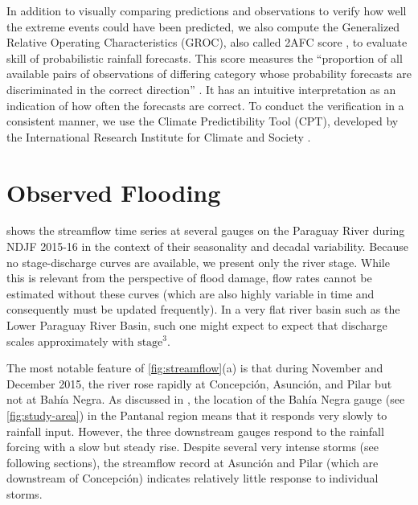 \documentclass[twocol]{ametsoc}
\begin{document}
In addition to visually comparing predictions and observations to verify how well the extreme events could have been predicted, we also compute the Generalized Relative Operating Characteristics (GROC), also called 2AFC score \citep{Mason:2009kr}, to evaluate skill of probabilistic rainfall forecasts.
This score measures the ``proportion of all available pairs of observations of differing category whose probability forecasts are discriminated in the correct direction'' \citep{Mason:2009kr}.
It has an intuitive interpretation as an indication of how often the forecasts are correct.
To conduct the verification in a consistent manner, we use the Climate Predictibility Tool (CPT), developed by the International Research Institute for Climate and Society \citep{Mason:2017gg}.


\section{Observed Flooding} \label{sec:diag}

 shows the streamflow time series at several gauges on the Paraguay River during NDJF 2015-16 in the context of their seasonality and decadal variability.
Because no stage-discharge curves are available, we present only the river stage.
While this is relevant from the perspective of flood damage, flow rates cannot be estimated without these curves (which are also highly variable in time and consequently must be updated frequently).
In a very flat river basin such as the Lower Paraguay River Basin, such one might expect to expect that discharge scales approximately with $\text{stage}^3$.

The most notable feature of \cref{fig:streamflow}(a) is that during November and December 2015, the river rose rapidly at Concepci\'on, Asunci\'on,  and Pilar but not at Bah\'ia Negra.
As discussed in \citet{Bravo:2011et,Barros:2004bn}, the location of the Bah\'ia Negra gauge (see \cref{fig:study-area}) in the Pantanal region means that it responds very slowly to rainfall input.
However, the three downstream gauges respond to the rainfall forcing with a slow but steady rise.
Despite several very intense storms (see following sections), the streamflow record at Asunci\'on and Pilar (which are downstream of Concepci\'on) indicates relatively little response to individual storms.
\end{document}
